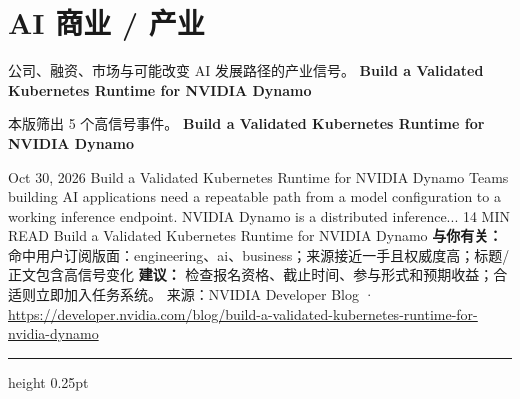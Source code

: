 \documentclass[10.5pt]{ctexart}
\begin{document}
\section*{AI 商业 / 产业}
{\color{ormuted} 公司、融资、市场与可能改变 AI 发展路径的产业信号。}
\vspace{2mm}
{\LARGE\bfseries Build a Validated Kubernetes Runtime for NVIDIA Dynamo}\par
\vspace{1mm}
{\color{ormuted} 本版筛出 5 个高信号事件。}
\vspace{3mm}
{\Large\bfseries Build a Validated Kubernetes Runtime for NVIDIA Dynamo}\par
Oct 30, 2026 Build a Validated Kubernetes Runtime for NVIDIA Dynamo Teams building AI applications need a repeatable path from a model configuration to a working inference endpoint. NVIDIA Dynamo is a distributed inference... 14 MIN READ Build a Validated Kubernetes Runtime for NVIDIA Dynamo
\textbf{与你有关：} 命中用户订阅版面：engineering、ai、business；来源接近一手且权威度高；标题/正文包含高信号变化
\textbf{建议：} 检查报名资格、截止时间、参与形式和预期收益；合适则立即加入任务系统。
{\footnotesize\color{ormuted} 来源：NVIDIA Developer Blog · \url{https://developer.nvidia.com/blog/build-a-validated-kubernetes-runtime-for-nvidia-dynamo}}
\vspace{4mm}
\hrule height 0.25pt
\vspace{3mm}
\end{document}
